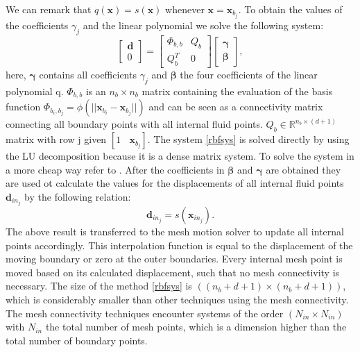 \documentclass[10pt,a4paper,twoside]{article}
\begin{document}
	We can remark that $q(\boldsymbol{x}) = s(\boldsymbol{x})$ whenever $\boldsymbol{x} = \boldsymbol{x}_{b_j}$. 
	To obtain the values of the coefficients $\gamma_j$ and the linear polynomial we solve the following system:
	\begin{equation}\label{rbfsys}
	\left[\begin{array}{c}
\boldsymbol{d} \\
0
	
	\end{array}
	 \right] = \left[ \begin{array}{cc}
	\Phi_{b,b} & Q_b \\
	Q_b^T & 0 
	 \end{array}
	  \right]	\left[\begin{array}{c}
	  \boldsymbol{\gamma} \\
	  \boldsymbol{\beta}
	  
	  \end{array}
	  \right],
	\end{equation}
	here, $ \boldsymbol{\gamma}$ contains all coefficients $\gamma_j$ and $ \boldsymbol{\beta}$ the four coefficients of the linear polynomial q. $\Phi_{b,b}$ is an $n_b\times n_b$ matrix containing the evaluation of the basis function $\Phi_{b_i,b_j} = \phi(||\boldsymbol{x}_{b_i} - \boldsymbol{x}_{b_j} ||)$ and can be seen as a connectivity matrix connecting all boundary points with all internal fluid points. $Q_b \in \mathbb{R}^{n_b \times (d+1)}$ matrix with row j given $[1~~~~ \boldsymbol{x}_{b_j}].$  The system \ref{rbfsys} is solved directly by using the LU decomposition because it is a dense matrix system. To solve the system in a more cheap way refer to \cite{bos2010numerical}. After the coefficients in $\boldsymbol{\beta}$ and $\boldsymbol{\gamma}$ are obtained they are used ot calculate the values for the displacements of all internal fluid points $\boldsymbol{d}_{in_j}$ by the following relation:
	\begin{equation}
	\boldsymbol{d}_{in_j} = s (\boldsymbol{x}_{in_j}).
	\end{equation}
	The above result is transferred to the mesh motion solver to update all internal points accordingly. This interpolation function is equal to the displacement of the moving boundary or zero at the outer boundaries. Every internal mesh point is moved based on its calculated displacement, such that no mesh connectivity is necessary. The size of the method \ref{rbfsys} is $((n_b +d +1) \times (n_b+d+1))$, which is considerably smaller than other techniques using the mesh connectivity. The mesh connectivity techniques encounter systems of the order $(N_{in}\times N_{in})$ with $N_{in}$ the total number of mesh points, which is a dimension higher than the total number of boundary points.
\end{document}
